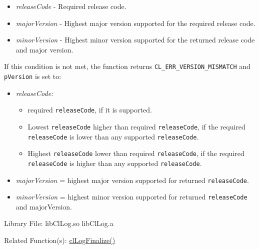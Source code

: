 \begin{flushleft}
\begin{Desc}
\begin{itemize}
\item
\textit{releaseCode} - Required release code.
\item
\textit{majorVersion} - Highest major version supported for the required release code.
\item
\textit{minorVersion} - Highest minor version supported for the returned release code and major version.
\end{itemize}
If this condition is not met, the function returns {\tt{CL\_\-ERR\_\-VERSION\_\-MISMATCH}} and {\tt{pVersion}} is set to:
\begin{itemize}
\item
\textit{releaseCode:}
	\begin{itemize}
	\item
	required {\tt{releaseCode}}, if it is supported.
	\item
	Lowest {\tt{releaseCode}} higher than required {\tt{releaseCode}}, if the required {\tt{releaseCode}} is lower than any 
	supported {\tt{releaseCode}}.
	\item
	Highest {\tt{releaseCode}} lower than required {\tt{releaseCode}}, if the required {\tt{releaseCode}} is higher than any 
	supported {\tt{releaseCode}}.
	\end{itemize}
\item
\textit{majorVersion} = highest major version supported for returned {\tt{releaseCode}}.
\item
\textit{minorVersion} = highest minor version supported for returned {\tt{releaseCode}} and majorVersion.
\end{itemize}
\end{Desc}
\begin{Desc}
\item[Library File:] libClLog.so
\newline
libClLog.a
\end{Desc}
\begin{Desc}
\item[Related Function(s):]\hyperlink{pagelog104}{clLogFinalize()}\end{Desc}
\newpage




\end{flushleft}
